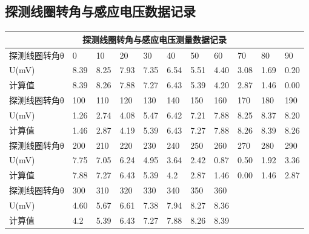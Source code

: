 \documentclass[12pt,a4paper]{article}
\begin{document}
    \subsection{探测线圈转角与感应电压数据记录}
        \begin{table}[H]
            \centering
            \begin{tabular}{|l|l|l|l|l|l|l|l|l|l|l|}
            \hline
                \multicolumn{11}{|c|}{探测线圈转角与感应电压测量数据记录} \\ \hline
                探测线圈转角θ & 0 & 10 & 20 & 30 & 40 & 50 & 60 & 70 & 80 & 90 \\ \hline
                U(mV) & 8.39 & 8.25 & 7.93 & 7.35 & 6.54 & 5.51 & 4.40 & 3.08 & 1.69 & 0.20 \\ \hline
                计算值 & 8.39 & 8.26& 7.88 & 7.27 & 6.43 & 5.39 & 4.20 & 2.87 & 1.46 & 0.00 \\ \hline
                探测线圈转角θ & 100 & 110 & 120 & 130 & 140 & 150 & 160 & 170 & 180 & 190 \\ \hline
                U(mV) & 1.26 & 2.74 & 4.08 & 5.47 & 6.42 & 7.21 & 7.88 & 8.25 & 8.37 & 8.20\\ \hline
                计算值 & 1.46 & 2.87 &4.19& 5.39 & 6.43 & 7.27 & 7.88 & 8.26 & 8.39 & 8.26 \\ \hline
                探测线圈转角θ & 200 & 210 & 220 & 230 & 240 & 250 & 260 & 270 & 280 & 290 \\ \hline
                U(mV) & 7.75 & 7.05 & 6.24 & 4.95 & 3.64 & 2.42 & 0.87 & 0.50 & 1.92 & 3.36\\ \hline
                计算值 & 7.88 & 7.27 & 6.43 & 5.39 & 4.2 & 2.87 & 1.46 & 0.00 & 1.46 &2.87\\ \hline
                探测线圈转角θ & 300 & 310 & 320 & 330 & 340 & 350 & 360 & ~ & ~& ~ \\ \hline
                U(mV) & 4.60 & 5.67 & 6.61 & 7.38 & 7.94 & 8.27 & 8.36 & ~ & ~ & ~\\ \hline
                计算值 & 4.2 & 5.39 & 6.43 & 7.27 & 7.88 & 8.26 & 8.39 & ~ & ~ & ~ \\ \hline
            \end{tabular}
        \end{table}
\end{document}
